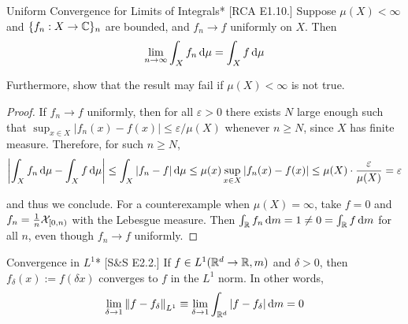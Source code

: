 \begin{problem}{Uniform Convergence for Limits of Integrals}*
    [RCA E1.10.] Suppose \(\mu(X) < \infty\) and \(\{f_n : X \to \mathbb{C}\}_n\) are bounded, and \(f_n \to f\) uniformly on \(X\). Then 
    \[
    \lim_{n \to \infty} \int_X f_n \, \mathrm{d}\mu = \int_X f \, \mathrm{d}\mu
    \]

    Furthermore, show that the result may fail if \(\mu(X) < \infty\) is not true. 
\end{problem}

\begin{proof}
    If \(f_n \to f\) uniformly, then for all \(\varepsilon > 0\) there exists \(N\) large enough such that \(\sup_{x \in X} |f_n(x) - f(x)| \leq \varepsilon / \mu(X)\) whenever \(n \geq N\), since \(X\) has finite measure. Therefore, for such \(n \geq N\), 
    \[
    \left| \int_X f_n \, \mathrm{d}\mu - \int_X f \, \mathrm{d}\mu \right| 
    \leq \int_X |f_n - f| \, \mathrm{d}\mu 
    \leq \mu(x) \sup_{x \in X} |f_n(x) - f(x)|
    \leq \mu(X) \cdot \frac{\varepsilon}{\mu(X)}
    = \varepsilon
    \]

    and thus we conclude. For a counterexample when \(\mu(X) = \infty\), take \(f = 0\) and \(f_n = \frac{1}{n} \mathcal{X}_{[0, n)}\) with the Lebesgue measure. Then \(\int_{\mathbb{R}} f_n \, \mathrm{d}m = 1 \neq 0 = \int_{\mathbb{R}} f \, \mathrm{d}m \) for all \(n\), even though \(f_n \to f\) uniformly. 
\end{proof}

\begin{problem}{Convergence in \(L^1\)}*
    [S\&S E2.2.] If \(f \in L^1(\mathbb{R}^d \to \mathbb{R}, m)\) and \(\delta > 0\), then \(f_\delta(x) := f(\delta x)\) converges to \(f\) in the \(L^1\) norm. In other words, 
    \[
    \lim_{\delta \to 1} \norm{ f - f_\delta }_{L^1} 
    \equiv \lim_{\delta \to 1} \int_{\mathbb{R}^d} |f - f_\delta| \, \mathrm{d}m = 0
    \]
\end{problem}

